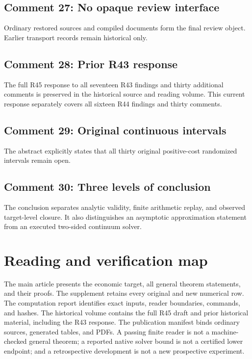 \subsection{Comment 27: No opaque review interface}
Ordinary restored sources and compiled documents form the final review object. Earlier transport records remain historical only.

\subsection{Comment 28: Prior R43 response}
The full R45 response to all seventeen R43 findings and thirty additional comments is preserved in the historical source and reading volume. This current response separately covers all sixteen R44 findings and thirty comments.

\subsection{Comment 29: Original continuous intervals}
The abstract explicitly states that all thirty original positive-cost randomized intervals remain open.

\subsection{Comment 30: Three levels of conclusion}
The conclusion separates analytic validity, finite arithmetic replay, and observed target-level closure. It also distinguishes an asymptotic approximation statement from an executed two-sided continuum solver.

\section{Reading and verification map}
The main article presents the economic target, all general theorem statements, and their proofs. The supplement retains every original and new numerical row. The computation report identifies exact inputs, reader boundaries, commands, and hashes. The historical volume contains the full R45 draft and prior historical material, including the R43 response. The publication manifest binds ordinary sources, generated tables, and PDFs. A passing finite reader is not a machine-checked general theorem; a reported native solver bound is not a certified lower endpoint; and a retrospective development is not a new prospective experiment.

